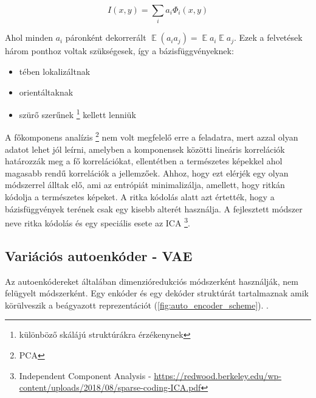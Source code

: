 \documentclass[12pt, english]{article}
\DeclareMathOperator*{\E}{\mathbb{E}}
\begin{document}
\vspace{4mm}

\begin{equation}
    I(x, y) = \sum_{i}a_i \Phi_{i}(x, y)
\end{equation}

\vspace{4mm}

\par Ahol minden $a_{i}$ páronként dekorrerált $\E (a_i a_j) = \E a_i \E a_j$. Ezek a felvetések három ponthoz voltak szükségesek, így a bázisfüggvényeknek:

\vspace{4mm}

\begin{itemize}
    \item tében lokalizáltnak
    \item orientáltaknak
    \item szürő szerűnek \footnote{különböző skálájú struktúrákra érzékenynek} kellett lenniük
\end{itemize}

\vspace{4mm}

\par A főkomponens analízis \footnote{PCA} nem volt megfelelő erre a feladatra, mert azzal olyan adatot lehet jól leírni, amelyben a komponensek közötti lineáris korrelációk határozzák meg a fő korrelációkat, ellentétben a természetes képekkel ahol magasabb rendű korrelációk a jellemzőek. Ahhoz, hogy ezt elérjék egy olyan módszerrel álltak elő, ami az entrópiát minimalizálja, amellett, hogy ritkán kódolja a természetes képeket. A ritka kódolás alatt azt értették, hogy a bázisfüggvények terének csak egy kisebb alterét használja. A fejlesztett módszer neve ritka kódolás és egy speciális esete az ICA \footnote{Independent Component Analysis - \url{https://redwood.berkeley.edu/wp-content/uploads/2018/08/sparse-coding-ICA.pdf}}.

\vspace{5mm}

\subsection{Variációs autoenkóder - VAE}

\vspace{5mm}

\par Az autoenkódereket általában dimenzióredukciós  módszerként használják, nem felügyelt módszerként. Egy enkóder és egy dekóder struktúrát tartalmaznak amik körülveszik a beágyazott reprezentációt (\ref{fig:auto_encoder_scheme}). .
\end{document}
